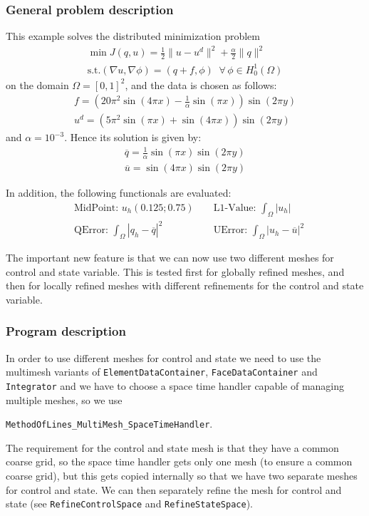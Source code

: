 \subsubsection{General problem description}
This example solves the distributed minimization problem
\begin{gather*}
\min J(q,u) = \frac{1}{2} \|u-u^d\|^2 + \frac{\alpha}{2}\|q\|^2\\
\text{s.t.} (\nabla u,\nabla \phi) = (q+f,\phi)\;\;\forall\,\phi \in H^1_0(\Omega)
\end{gather*}
on the domain $\Omega = [0,1]^2$, and the data is chosen as follows:
\begin{gather*}
 f = \left(20\pi^2  \sin(4 \pi x) - \frac{1}{\alpha}  \sin(\pi x)\right) \sin(2 \pi y)\\
 u^d = \left( 5 \pi^2 \sin(\pi x) + \sin(4 \pi x)\right)  \sin(2\pi y)
\end{gather*}
and $\alpha = 10^{-3}$.
Hence its solution is given by:
\begin{gather*}
 \overline{q} = \frac{1}{\alpha} \sin(\pi x) \sin(2 \pi y)\\
 \overline{u} = \sin(4 \pi x) \sin(2 \pi y)
\end{gather*}

In addition, the following functionals are evaluated:
\begin{align*}
  &\text{MidPoint: } u_h(0.125 ; 0.75)&&
  \text{ L1-Value: }\int_\Omega |u_h|\\
  &\text{QError: }\int_\Omega |q_h-\overline{q}|^2
  &&\text{  UError: }\int_\Omega |u_h-\overline{u}|^2
\end{align*}
 
The important new feature is that we can now use two different meshes for control and state variable.
This is tested first for globally refined meshes, and then for locally refined meshes with different refinements for the control and state variable.
\subsubsection{Program description}
In order to use different meshes for control and state we need to use the multimesh variants of \texttt{ElementDataContainer}, \texttt{FaceDataContainer} and \texttt{Integrator} and we have to choose a space time handler capable of managing multiple meshes, so we use 

\texttt{MethodOfLines\_MultiMesh\_SpaceTimeHandler}.

The requirement for the control and state mesh is that they have a common coarse grid, so the space time handler gets only one mesh (to ensure a common coarse grid), but this gets copied internally so that we have two separate meshes for control and state. We can then separately refine the mesh for control and state (see \texttt{RefineControlSpace} and  \texttt{RefineStateSpace}).

